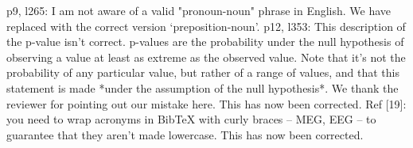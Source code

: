 \documentclass[10pt,letterpaper]{article}
\begin{document}
\color{black}
\newline
\noindent
p9, l265: I am not aware of a valid "pronoun-noun" phrase in English.
\color{blue}
We have replaced with the correct version ‘preposition-noun’.
\color{black}
\newline
\noindent
p12, l353: This description of the p-value isn't correct. p-values are the probability under the null hypothesis of observing a value at least as extreme as the observed value. Note that it's not the probability of any particular value, but rather of a range of values, and that this statement is made *under the assumption of the null hypothesis*.
\color{blue}
We thank the reviewer for pointing out our mistake here. This has now been corrected.
\color{black}
\newline
\noindent
Ref [19]: you need to wrap acronyms in BibTeX with curly braces -- {MEG}, {EEG} -- to guarantee that they aren't made lowercase.
\color{blue}
This has now been corrected.
\end{document}
